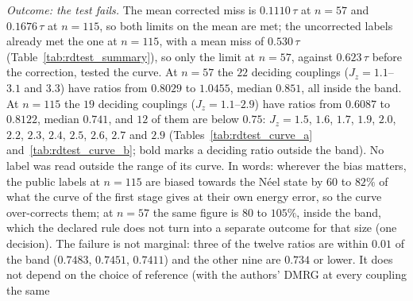 \documentclass[aps,prx,onecolumn,10pt,nofootinbib,longbibliography,floatfix]{revtex4-2}
\theoremstyle{remark}
\newcommand{\Jz}{J_z}
\begin{document}
\emph{Outcome: the test fails.} The mean corrected miss is $0.1110\,\tau$ at $n=57$ and $0.1676\,\tau$ at $n=115$, %
so both limits on the mean are met; the uncorrected labels already met the one at $n=115$, with a mean miss of %
$0.530\,\tau$ (Table~\ref{tab:rdtest_summary}), so only the limit at $n=57$, against $0.623\,\tau$ before the %
correction, tested the curve. At $n=57$ the $22$ deciding couplings ($\Jz=1.1$--$3.1$ and $3.3$) have ratios %
from $0.8029$ to $1.0455$, median $0.851$, all inside the band. At $n=115$ the $19$ deciding couplings %
($\Jz=1.1$--$2.9$) have ratios from $0.6087$ to $0.8122$, median $0.741$, and $12$ of them are below $0.75$: %
$\Jz=1.5$, $1.6$, $1.7$, $1.9$, $2.0$, $2.2$, $2.3$, $2.4$, $2.5$, $2.6$, $2.7$ and $2.9$ %
(Tables~\ref{tab:rdtest_curve_a} and~\ref{tab:rdtest_curve_b}; bold marks a deciding ratio outside the band).
No label was read outside the range of its curve. In words: wherever the bias matters, the public labels at $n=115$
are biased towards the N\'eel state by $60$ to $82\%$ of what the curve of the first stage gives at their own energy %
error, so the curve over-corrects them; at $n=57$ the same figure is $80$ to $105\%$, inside the band, which the %
declared rule does not turn into a separate outcome for that size (one decision). The failure is not marginal:
three of the twelve ratios are within $0.01$ of the band ($0.7483$, $0.7451$, $0.7411$) and the other nine are %
$0.734$ or lower. It does not depend on the choice of reference (with the authors' DMRG at every coupling the same %
\end{document}

